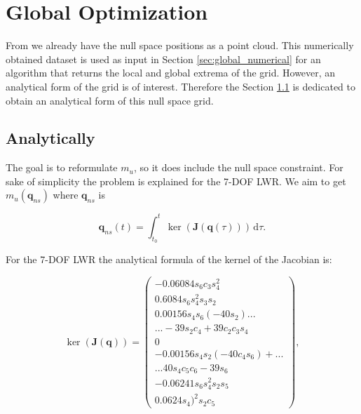 \chapter{Global Optimization}
\label{ch:globaloptimization}


From \cite{fabianthesis} we already have the null space positions as a point cloud. This numerically obtained dataset is used as input in Section \ref{sec:global_numerical} for an algorithm that returns the local and global extrema of the grid. However, an analytical form of the grid is of interest. Therefore the Section \ref{sec:global_analytical} is dedicated to obtain an analytical form  of this null space grid.




\section{Analytically}
\label{sec:global_analytical}



\label{subsec:imposing_ns_constraint}


The goal is to reformulate $m_u$, so it does include the null space constraint. 
For sake of simplicity the problem is explained for the 7-DOF LWR.  We aim to get $m_u(\mathbf{q}_{ns})$ where $\mathbf{q}_{ns}$ is


\begin{equation}
\mathbf{q}_{ns}(t) = \int_{t_0}^t \! \ker(\mathbf{J}(\mathbf{q}(\tau))) \, \mathrm{d}\tau. 
\label{eq:integral_kernel}
\end{equation}

For the 7-DOF LWR the analytical formula of the kernel of the Jacobian is:

\begin{equation}
\ker(\mathbf{J}(\mathbf{q}))  =\begin{pmatrix} -0.06084s_6 c_3 s_4^2\\
0. 6084s_6 s_4^2 s_3 s_2\\
0.00156s_4 s_6 (-40s_2)...\\
...-39s_2 c_4 +39c_2 c_3 s_4\\
0\\
-0.00156s_4 s_2 (-40c_4 s_6)+...\\
...40s_4 c_5 c_6 -39s_6\\
-0.06241s_6 s_4^2 s_2 s_5\\
0.0624s_4)^2 s_2 c_5	
\end{pmatrix}	,
\label{eq:dq_ns}
\end{equation}


